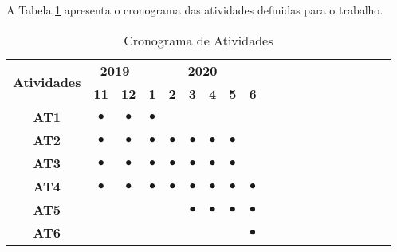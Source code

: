 A Tabela \ref{tabela_cronograma} apresenta o cronograma das atividades definidas para o trabalho.

\begin{table}[ht]
    \centering
    \footnotesize
    \def \arraystretch{0.8}
    \caption{Cronograma de Atividades}
    \begin{tabular}{|c|c|c|c|c|c|c|c|c|c|c|c|c|c|c|c|c|c|c|}
        \hline
        \multirow{2}{*}{\bf Atividades} & \multicolumn{2}{c|}{\bf 2019} & \multicolumn{6}{c|}{\bf 2020} \\ \cline{2-9} 
        & \bf 11 & \bf 12 & \bf 1 & \bf 2 & \bf 3 & \bf 4 & \bf 5 & \bf 6  \\  
        \hline
        \bf AT1 & $\bullet$ & $\bullet$ & $\bullet$ &  &  &  &  &\\
        \hline
        \bf AT2 & $\bullet$ & $\bullet$ & $\bullet$ & $\bullet$ & $\bullet$ & $\bullet$ & $\bullet$ &\\
        \hline
        \bf AT3 & $\bullet$ & $\bullet$ & $\bullet$ & $\bullet$ & $\bullet$ & $\bullet$ & $\bullet$ & \\
        \hline
        \bf AT4 & $\bullet$ & $\bullet$ & $\bullet$ & $\bullet$ & $\bullet$ & $\bullet$ & $\bullet$ & $\bullet$\\
        \hline
        \bf AT5 & & & & & $\bullet$ & $\bullet$ & $\bullet$ & $\bullet$\\
        \hline
        \bf AT6 &  &  &  &  &  & & & $\bullet$\\
        \hline
    \end{tabular}
    \label{tabela_cronograma}
\end{table}